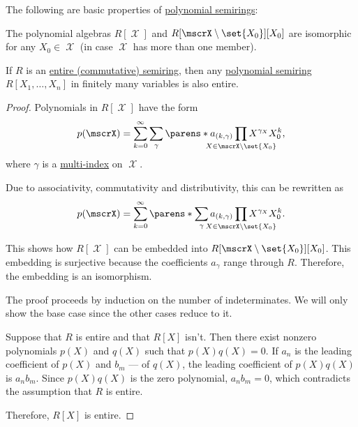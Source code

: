 \begin{proposition}\label{thm:def:polynomial_semiring/properties}
  The following are basic properties of \hyperref[def:polynomial_semiring]{polynomial semirings}:
  \begin{thmenum}
     The polynomial algebras \( R[\mscrX] \) and \( R[\mscrX \setminus \set{ X_0 }][X_0] \) are isomorphic for any \( X_0 \in \mscrX \) (in case \( \mscrX \) has more than one member).

     If \( R \) is an \hyperref[def:divisibility/zero]{entire (commutative) semiring}, then any \hyperref[def:polynomial_semiring]{polynomial semiring} \( R[X_1, \ldots, X_n] \) in finitely many variables is also entire.
  \end{thmenum}
\end{proposition}
\begin{proof}
   Polynomials in \( R[\mscrX] \) have the form
  \begin{equation*}
    p(\mscrX) = \sum_{k=0}^\infty \sum_\gamma \parens*{ a_{(k,\gamma)} \prod_{\mathclap{X \in \mscrX \setminus \set{ X_0 }}} X^{\gamma_X} } X_0^k,
  \end{equation*}
  where \( \gamma \) is a \hyperref[def:multi_index]{multi-index} on \( \mscrX \).

  Due to associativity, commutativity and distributivity, this can be rewritten as
  \begin{equation*}
    p(\mscrX) = \sum_{k=0}^\infty \parens*{ \sum_\gamma a_{(k,\gamma)} \prod_{\mathclap{X \in \mscrX \setminus \set{ X_0 }}} X^{\gamma_X} } X_0^k.
  \end{equation*}

  This shows how \( R[\mscrX] \) can be embedded into \( R[\mscrX \setminus \set{ X_0 }][X_0] \). This embedding is surjective because the coefficients \( a_\gamma \) range through \( R \). Therefore, the embedding is an isomorphism.

   The proof proceeds by induction on the number of indeterminates. We will only show the base case since the other cases reduce to it.

  Suppose that \( R \) is entire and that \( R[X] \) isn't. Then there exist nonzero polynomials \( p(X) \) and \( q(X) \) such that \( p(X) q(X) = 0 \). If \( a_n \) is the leading coefficient of \( p(X) \) and \( b_m \) --- of \( q(X) \), the leading coefficient of \( p(X) q(X) \) is \( a_n b_m \). Since \( p(X) q(X) \) is the zero polynomial, \( a_n b_m = 0 \), which contradicts the assumption that \( R \) is entire.

  Therefore, \( R[X] \) is entire.
\end{proof}

